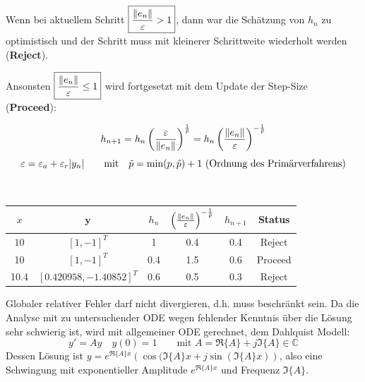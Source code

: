        \begin{minipage}{7.5cm}
          Wenn bei aktuellem Schritt $\boxed{\frac{\Arrowvert e_n \Arrowvert}{\varepsilon} > 1}$, dann war die
          Schätzung von $h_n$ zu optimistisch und der Schritt muss mit kleinerer Schrittweite wiederholt
          werden (\textbf{Reject}).

          Ansonsten $\boxed{\frac{\Arrowvert e_n \Arrowvert}{\varepsilon} \leq 1}$ wird fortgesetzt mit dem Update der Step-Size (\textbf{Proceed}):

          $$h_{n+1} = h_n \left( \frac{\varepsilon}{\Arrowvert e_n \Arrowvert} \right)^{\frac{1}{\tilde{p}}}=
          h_n \left( \frac{\Arrowvert e_n \Arrowvert}{\varepsilon} \right)^{-\frac{1}{\tilde{p}}}$$
          $$\varepsilon=\varepsilon_a+\varepsilon_r|y_n|
           \text{\qquad mit\quad} \tilde{p} = \min(p, \hat{p})+1 \text{ (Ordnung des Primärverfahrens)}$$
        \end{minipage}
        \hspace{0.5cm}
        \begin{minipage}{10.5cm}
          \\
          \begin{tabular}{cccccc}
            \hline
            $x$ & $\bm y$ & $h_n$ & $\left( \frac{\Arrowvert e_n \Arrowvert}{\varepsilon} \right)^{-\frac{1}{\tilde{p}}}$ & $h_{n+1}$ & Status \\
            \hline
            $10$ & $[1, -1]^T$ & 1 & 0.4 & 0.4 & Reject\\
            10 & $[1,-1]^T$ & 0.4 & 1.5 & 0.6 & Proceed\\
            10.4 & $[0.420958, -1.40852]^T$ & 0.6 & 0.5 & 0.3 & Reject\\
            \hline
          \end{tabular}
        \end{minipage}



      Globaler relativer Fehler darf nicht divergieren, d.h. muss beschränkt sein.
      Da die Analyse mit zu untersuchender ODE wegen fehlender Kenntnis über die Lösung sehr schwierig
      ist, wird mit allgemeiner ODE gerechnet, dem Dahlquist Modell:
      $$y' = A y \quad y(0) = 1 \qquad \text{mit } A = \Re\{A\} + j \Im\{A\} \in \mathbb{C}$$
      Dessen Lösung ist $y = e^{\Re\{A\} x} \left( \cos(\Im\{A\}x + j \sin(\Im\{A\} x) \right)$, also
      eine Schwingung mit exponentieller Amplitude $e^{\Re\{A\} x}$ und Frequenz $\Im\{A\}$.

